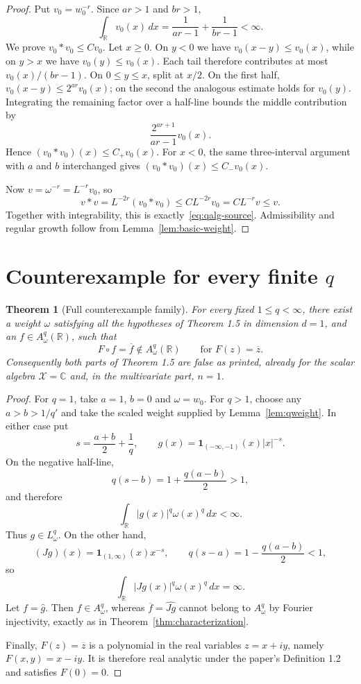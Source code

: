 \documentclass[11pt]{article}
\newtheorem{theorem}{Theorem}
\newcommand{\R}{\mathbb R}
\newcommand{\C}{\mathbb C}
\begin{document}
\begin{proof}
Put $v_0=w_0^{-r}$.  Since $ar>1$ and $br>1$,
\[
 \int_\R v_0(x)\,dx=\frac1{ar-1}+\frac1{br-1}<\infty.
\]
We prove $v_0*v_0\le Cv_0$.  Let $x\ge0$.  On $y<0$ we have
$v_0(x-y)\le v_0(x)$, while on $y>x$ we have $v_0(y)\le v_0(x)$.
Each tail therefore contributes at most $v_0(x)/(br-1)$.  On
$0\le y\le x$, split at $x/2$.  On the first half,
$v_0(x-y)\le2^{ar}v_0(x)$; on the second the analogous estimate holds for
$v_0(y)$.  Integrating the remaining factor over a half-line bounds the
middle contribution by
\[
 \frac{2^{ar+1}}{ar-1}v_0(x).
\]
Hence $(v_0*v_0)(x)\le C_+v_0(x)$.  For $x<0$, the same three-interval
argument with $a$ and $b$ interchanged gives
$(v_0*v_0)(x)\le C_-v_0(x)$.

Now $v=\omega^{-r}=L^{-r}v_0$, so
\[
 v*v=L^{-2r}(v_0*v_0)
 \le C L^{-2r}v_0=C L^{-r}v\le v.
\]
Together with integrability, this is exactly~\eqref{eq:qalg-source}.
Admissibility and regular growth follow from Lemma~\ref{lem:basic-weight}.
\end{proof}

\section{Counterexample for every finite \texorpdfstring{$q$}{q}}

\begin{theorem}[Full counterexample family]\label{thm:counterexample}
For every fixed $1\le q<\infty$, there exist a weight $\omega$ satisfying
all the hypotheses of Theorem 1.5 in dimension $d=1$, and an
$f\in A^q_\omega(\R)$, such that
\[
 F\circ f=\overline f\notin A^q_\omega(\R)
 \qquad\text{for }F(z)=\overline z.
\]
Consequently both parts of Theorem 1.5 are false as printed, already for
the scalar algebra $\mathcal X=\C$ and, in the multivariate part, $n=1$.
\end{theorem}

\begin{proof}
For $q=1$, take $a=1$, $b=0$ and $\omega=w_0$.  For $q>1$, choose any
$a>b>1/q'$ and take the scaled weight supplied by
Lemma~\ref{lem:qweight}.  In either case put
\[
 s=\frac{a+b}{2}+\frac1q,
 \qquad g(x)=\mathbf 1_{(-\infty,-1)}(x)|x|^{-s}.
\]
On the negative half-line,
\[
 q(s-b)=1+\frac{q(a-b)}2>1,
\]
and therefore
\[
 \int_\R |g(x)|^q\omega(x)^q\,dx<\infty.
\]
Thus $g\in L^q_\omega$.  On the other hand,
\[
 (Jg)(x)=\mathbf 1_{(1,\infty)}(x)x^{-s},
 \qquad q(s-a)=1-\frac{q(a-b)}2<1,
\]
so
\[
 \int_\R |Jg(x)|^q\omega(x)^q\,dx=\infty.
\]
Let $f=\widehat g$.  Then $f\in A^q_\omega$, whereas
$\overline f=\widehat{Jg}$ cannot belong to $A^q_\omega$ by Fourier
injectivity, exactly as in Theorem~\ref{thm:characterization}.

Finally, $F(z)=\overline z$ is a polynomial in the real variables
$z=x+iy$, namely $F(x,y)=x-iy$.  It is therefore real analytic under the
paper's Definition 1.2 and satisfies $F(0)=0$.
\end{proof}
\end{document}
